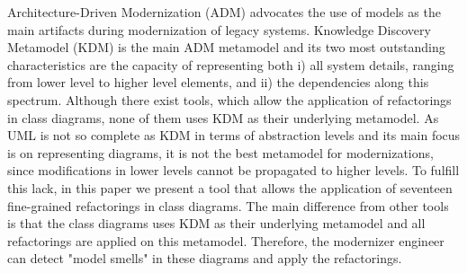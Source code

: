 
Architecture-Driven Modernization (ADM) advocates the use of models as the main artifacts during modernization of legacy systems. Knowledge Discovery Metamodel (KDM) is the main ADM metamodel and its two most outstanding characteristics are the capacity of representing both i) all system details, ranging from lower level to higher level elements, and ii) the dependencies along this spectrum. Although there exist tools, which allow the application of refactorings in class diagrams, none of them uses KDM as their underlying metamodel. As UML is not so complete as KDM in terms of abstraction levels and its main focus is on representing diagrams, it is not the best metamodel for modernizations, since modifications in lower levels cannot be propagated to higher levels. To fulfill this lack, in this paper we present a tool that allows the application of seventeen fine-grained refactorings in class diagrams. The main difference from other tools is that the class diagrams uses KDM as their underlying metamodel and all refactorings are applied on this metamodel. Therefore, the modernizer engineer can detect "model smells" in these diagrams and apply the refactorings.







